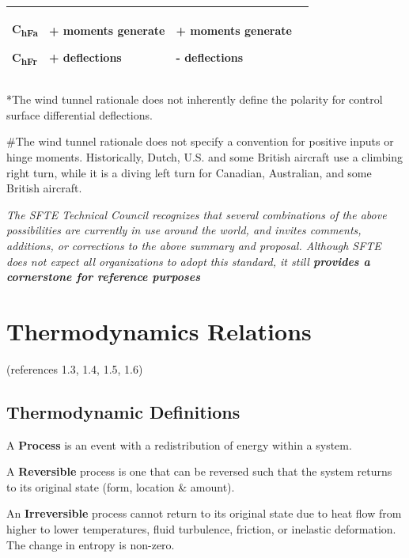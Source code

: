 \documentclass[
]{book}
\begin{document}
\begin{longtable}[]{@{}llll@{}}
\begin{minipage}[t]{0.14\columnwidth}
C\textsubscript{hFa}

C\textsubscript{hFr}\strut
\end{minipage} & \begin{minipage}[t]{0.17\columnwidth}\raggedright
+ moments generate

+ deflections\strut
\end{minipage} & \begin{minipage}[t]{0.17\columnwidth}\raggedright
+ moments generate

- deflections\strut
\end{minipage}\tabularnewline
\bottomrule
\end{longtable}

*The wind tunnel rationale does not inherently define the polarity for control surface differential deflections.

\#The wind tunnel rationale does not specify a convention for positive inputs or hinge moments. Historically, Dutch, U.S. and some British aircraft use a climbing right turn, while it is a diving left turn for Canadian, Australian, and some British aircraft.

\emph{The SFTE Technical Council recognizes that several combinations of the above possibilities are currently in use around the world, and invites comments, additions, or corrections to the above summary and proposal. Although SFTE does not expect all organizations to adopt this standard, it still \textbf{provides a cornerstone for reference purposes}}

\hypertarget{thermodynamics-relations}{%
\section{Thermodynamics Relations}\label{thermodynamics-relations}}

(references 1.3, 1.4, 1.5, 1.6)

\hypertarget{thermodynamic-definitions}{%
\subsection{Thermodynamic Definitions}\label{thermodynamic-definitions}}

A \textbf{Process} is an event with a redistribution of energy within a system.

A \textbf{Reversible} process is one that can be reversed such that the system returns to its original state (form, location \& amount).

An \textbf{Irreversible} process cannot return to its original state due to heat flow from higher to lower temperatures, fluid turbulence, friction, or inelastic deformation. The change in entropy is non-zero.
\end{document}
